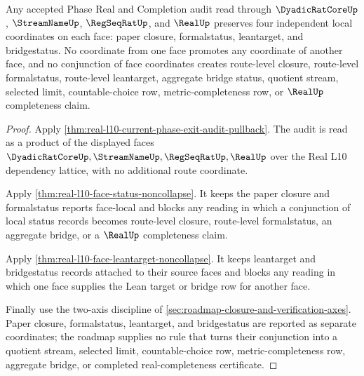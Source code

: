 \begin{theorem}
\label{thm:real-l10-face-axis-independence}
Any accepted Phase Real and Completion audit read through
$\DyadicRatCoreUp$, $\StreamNameUp$, $\RegSeqRatUp$, and $\RealUp$ preserves
four independent local coordinates on each face: paper closure, formalstatus,
leantarget, and bridgestatus. No coordinate from one face promotes any
coordinate of another face, and no conjunction of face coordinates creates
route-level closure, route-level formalstatus, route-level leantarget,
aggregate bridge status, quotient stream, selected limit, countable-choice
row, metric-completeness row, or $\RealUp$ completeness claim.
\end{theorem}
\begin{proof}
Apply \autoref{thm:real-l10-current-phase-exit-audit-pullback}. The audit is
read as a product of the displayed faces
$\DyadicRatCoreUp,\StreamNameUp,\RegSeqRatUp,\RealUp$ over the Real L10
dependency lattice, with no additional route coordinate.

Apply \autoref{thm:real-l10-face-status-noncollapse}. It keeps the paper
closure and formalstatus reports face-local and blocks any reading in which a
conjunction of local status records becomes route-level closure, route-level
formalstatus, an aggregate bridge, or a $\RealUp$ completeness claim.

Apply \autoref{thm:real-l10-face-leantarget-noncollapse}. It keeps
leantarget and bridgestatus records attached to their source faces and blocks
any reading in which one face supplies the Lean target or bridge row for
another face.

Finally use the two-axis discipline of
\autoref{sec:roadmap-closure-and-verification-axes}. Paper closure,
formalstatus, leantarget, and bridgestatus are reported as separate
coordinates; the roadmap supplies no rule that turns their conjunction into a
quotient stream, selected limit, countable-choice row, metric-completeness
row, aggregate bridge, or completed real-completeness certificate.
\end{proof}

